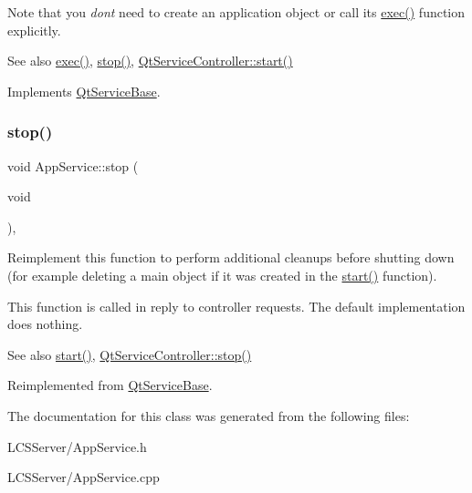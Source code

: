Note that you {\itshape don\textquotesingle{}t} need to create an application object or call its \hyperlink{class_qt_service_base_afae2e589de71c1ae3ae8db3dc9ab9c64}{exec()} function explicitly.

\begin{DoxySeeAlso}{See also}
\hyperlink{class_qt_service_base_afae2e589de71c1ae3ae8db3dc9ab9c64}{exec()}, \hyperlink{class_app_service_a343b5fb7522b24f9fc6dd2aeda940f01}{stop()}, \hyperlink{class_qt_service_controller_a5e9d6da5081d70f31611456d0ef0687e}{Qt\+Service\+Controller\+::start()} 
\end{DoxySeeAlso}


Implements \hyperlink{class_qt_service_base_adbc0cd621b41bd3a6a1f62fda432e9e4}{Qt\+Service\+Base}.

\mbox{\label{class_app_service_a343b5fb7522b24f9fc6dd2aeda940f01}} 
\subsubsection{\texorpdfstring{stop()}{stop()}}
{\footnotesize\ttfamily void App\+Service\+::stop (\begin{DoxyParamCaption}\item[{void}]{ }\end{DoxyParamCaption})\hspace{0.3cm}{\ttfamily [protected]}, {\ttfamily [virtual]}}

Reimplement this function to perform additional cleanups before shutting down (for example deleting a main object if it was created in the \hyperlink{class_app_service_a987c81ba936b7ce15b84cba99851dabb}{start()} function).

This function is called in reply to controller requests. The default implementation does nothing.

\begin{DoxySeeAlso}{See also}
\hyperlink{class_app_service_a987c81ba936b7ce15b84cba99851dabb}{start()}, \hyperlink{class_qt_service_controller_ad06afa647666769e309474b18bf7cf90}{Qt\+Service\+Controller\+::stop()} 
\end{DoxySeeAlso}


Reimplemented from \hyperlink{class_qt_service_base_a8d52c1b8fd06b50bdc0a0c6f9936a68e}{Qt\+Service\+Base}.



The documentation for this class was generated from the following files\+:\begin{DoxyCompactItemize}
\item 
L\+C\+S\+Server/App\+Service.\+h\item 
L\+C\+S\+Server/App\+Service.\+cpp\end{DoxyCompactItemize}
